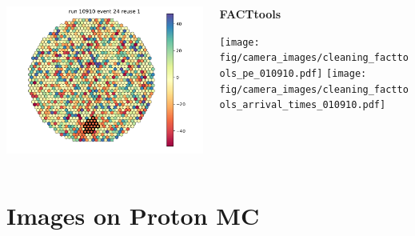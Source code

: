 \begin{withoutheadline}
\begin{frame}{}
\begin{columns}[onlytextwidth]
\begin{column}{0.33\textwidth}
        \includegraphics[width=\textwidth, page=43]{fig/camera_images/cleaning_thresh_arrival_times_010910.pdf}
      \end{column}
    \hfill%
      \begin{column}{0.33\textwidth}
          \centering
        \textbf{FACTtools}\par\medskip
        \texttt{[image: fig/camera\_images/cleaning\_facttools\_pe\_010910.pdf]}
        \texttt{[image: fig/camera\_images/cleaning\_facttools\_arrival\_times\_010910.pdf]}
      \end{column}
    \end{columns}
  \end{frame}
\end{withoutheadline}

\section{Images on Proton MC}

